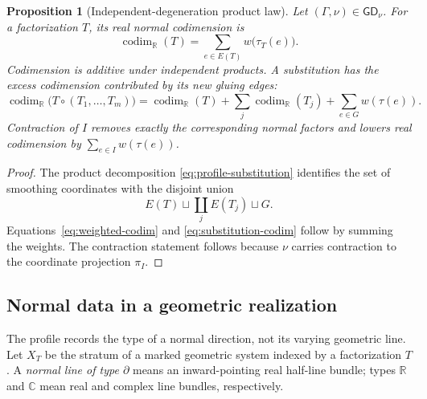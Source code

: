 \documentclass[11pt,letterpaper,twoside]{article}
\theoremstyle{plain}
\newtheorem{proposition}[theorem]{Proposition}
\theoremstyle{definition}
\theoremstyle{remark}
\newcommand{\LGrm}{\mathsf{GD}_{\nu}}
\begin{document}
\begin{proposition}[Independent-degeneration product law]\label{prop:profile-product}
Let \((\Gamma,\nu)\in\LGrm\).  For a factorization \(T\), its real normal codimension is
\begin{equation}\label{eq:weighted-codim}
 \operatorname{codim}_{\mathbb R}(T)
 =\sum_{e\in E(T)}w\bigl(\tau_T(e)\bigr).
\end{equation}
Codimension is additive under independent products.  A substitution has the excess codimension contributed by its new gluing edges:
\begin{equation}\label{eq:substitution-codim}
 \operatorname{codim}_{\mathbb R}
 \bigl(T\circ(T_1,\ldots,T_m)\bigr)
 =\operatorname{codim}_{\mathbb R}(T)
 +\sum_j\operatorname{codim}_{\mathbb R}(T_j)
 +\sum_{e\in G}w(\tau(e)).
\end{equation}
Contraction of \(I\) removes exactly the corresponding normal factors and lowers real codimension by \(\sum_{e\in I}w(\tau(e))\).
\end{proposition}

\begin{proof}
The product decomposition \eqref{eq:profile-substitution} identifies the set of smoothing coordinates with the disjoint union
\[
 E(T)\sqcup\coprod_jE(T_j)\sqcup G.
\]
Equations~\eqref{eq:weighted-codim} and \eqref{eq:substitution-codim} follow by summing the weights.  The contraction statement follows because \(\nu\) carries contraction to the coordinate projection \(\pi_I\).
\end{proof}

\subsection{Normal data in a geometric realization}

The profile records the type of a normal direction, not its varying geometric line.  Let \(X_T\) be the stratum of a marked geometric system indexed by a factorization \(T\).  A \emph{normal line of type \(\partial\)} means an inward-pointing real half-line bundle; types \(\mathbb R\) and \(\mathbb C\) mean real and complex line bundles, respectively.
\end{document}
